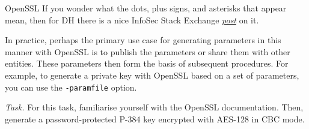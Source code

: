 \documentclass{practice}
\begin{document}
\begin{task}{OpenSSL}
  If you wonder what the dots, plus signs, and asterisks that appear mean, then for DH there is a nice InfoSec Stack Exchange \href{https://security.stackexchange.com/a/140639}{\textit{post}} on it.

  In practice, perhaps the primary use case for generating parameters in this manner with OpenSSL is to publish the parameters or share them with other entities.
  These parameters then form the basis of subsequent procedures\footnotemark{}.
  For example, to generate a private key with OpenSSL based on a set of parameters, you can use the \texttt{-paramfile} option.

  \textit{Task.}
  For this task, familiarise yourself with the OpenSSL documentation.
  Then, generate a password-protected P-384 key encrypted with AES-128 in CBC mode.\footnotemark{}
\end{task}
\end{document}
